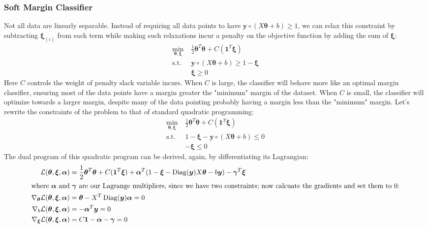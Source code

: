 \documentclass{article}
\renewcommand{\pmb}[1]{\boldsymbol{#1}}
\DeclareMathOperator{\Diag}{Diag}
\begin{document}
\subsubsection{Soft Margin Classifier}
Not all data are linearly separable. Instead of requiring all data points to have $\pmb y \circ (X \pmb\theta + b) \geq 1$, we can relax this constraint by subtracting $\pmb\xi_{(i)}$ from each term while making such relaxations incur a penalty on the objective function by adding the sum of $\pmb\xi$:
\begin{align*}
	\min_{\pmb\theta, \pmb\xi}\; &\frac{1}{2} \pmb\theta^T \pmb\theta + C(\pmb 1^T \pmb\xi) \\
	\text{s.t.}\; &\pmb y \circ (X \pmb\theta + b) \geq 1 - \pmb\xi \\
	& \pmb\xi \geq 0
\end{align*}
Here $C$ controls the weight of penalty slack variable incurs. When $C$ is large, the classifier will behave more like an optimal margin classifier, ensuring most of the data points have a margin greater the "minimum" margin of the dataset. When $C$ is small, the classifier will optimize towards a larger margin, despite many of the data pointing probably having a margin less than the "minimum" margin.\newline\newline
Let's rewrite the constraints of the problem to that of standard quadratic programming:
\begin{align*}
	\min_{\pmb\theta, \pmb\xi}\; &\frac{1}{2} \pmb\theta^T \pmb\theta + C(\pmb 1^T \pmb\xi) \\
	\text{s.t.}\; &1 - \pmb\xi - \pmb y \circ (X \pmb\theta + b) \leq 0 \\
	&-\pmb\xi \leq 0
\end{align*}
The dual program of this quadratic program can be derived, again, by differentiating its Lagrangian:
\begin{align*}
	\mathcal{L}(\pmb\theta, \pmb\xi, \pmb\alpha) &= \frac{1}{2} \pmb\theta^T \pmb\theta + C(\pmb 1^T \pmb\xi) + \pmb\alpha^T (1 - \pmb\xi - \Diag(\pmb y)X\pmb\theta - b\pmb y) - \pmb\gamma^T \pmb\xi \\
	\intertext{where $\pmb\alpha$ and $\pmb\gamma$ are our Lagrange multipliers, since we have two constraints; now calcuate the gradients and set them to $0$:}
	\nabla_{\pmb\theta} \mathcal{L}(\pmb\theta, \pmb\xi, \pmb\alpha) &= \pmb\theta - X^T \Diag(\pmb y) \pmb\alpha = 0 \\
	\nabla_{b} \mathcal{L}(\pmb\theta, \pmb\xi, \pmb\alpha) &= - \pmb\alpha^T \pmb y = 0 \\ 
	\nabla_{\pmb\xi} \mathcal{L}(\pmb\theta, \pmb\xi, \pmb\alpha) &= C \pmb 1 - \pmb\alpha - \pmb\gamma = 0 
\end{align*}
\end{document}
